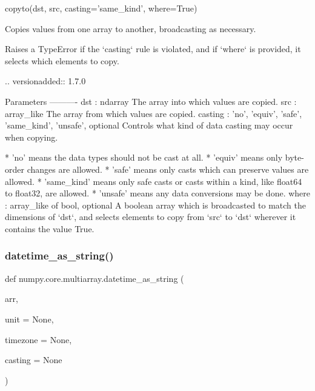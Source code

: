 \begin{DoxyVerb}copyto(dst, src, casting='same_kind', where=True)

Copies values from one array to another, broadcasting as necessary.

Raises a TypeError if the `casting` rule is violated, and if
`where` is provided, it selects which elements to copy.

.. versionadded:: 1.7.0

Parameters
----------
dst : ndarray
    The array into which values are copied.
src : array_like
    The array from which values are copied.
casting : {'no', 'equiv', 'safe', 'same_kind', 'unsafe'}, optional
    Controls what kind of data casting may occur when copying.

      * 'no' means the data types should not be cast at all.
      * 'equiv' means only byte-order changes are allowed.
      * 'safe' means only casts which can preserve values are allowed.
      * 'same_kind' means only safe casts or casts within a kind,
        like float64 to float32, are allowed.
      * 'unsafe' means any data conversions may be done.
where : array_like of bool, optional
    A boolean array which is broadcasted to match the dimensions
    of `dst`, and selects elements to copy from `src` to `dst`
    wherever it contains the value True.
\end{DoxyVerb}
 \mbox{\label{namespacenumpy_1_1core_1_1multiarray_a11d8d711b88119055158c62a2dd39824}} 
\subsubsection{\texorpdfstring{datetime\+\_\+as\+\_\+string()}{datetime\_as\_string()}}
{\footnotesize\ttfamily def numpy.\+core.\+multiarray.\+datetime\+\_\+as\+\_\+string (\begin{DoxyParamCaption}\item[{}]{arr,  }\item[{}]{unit = {\ttfamily None},  }\item[{}]{timezone = {\ttfamily None},  }\item[{}]{casting = {\ttfamily None} }\end{DoxyParamCaption})}

